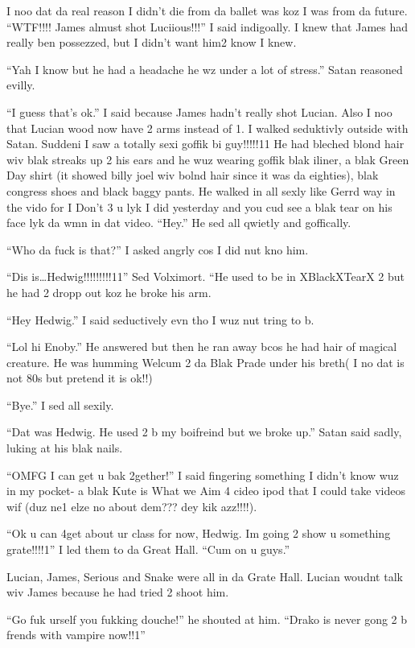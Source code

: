 I noo dat da real reason I didn't die from da ballet was koz I was from da future. \enquote{WTF!!!! James almust shot Luciious!!!} I said indigoally. I knew that James had really ben possezzed, but I didn't want him2 know I knew.

\enquote{Yah I know but he had a headache he wz under a lot of stress.} Satan reasoned evilly.

\enquote{I guess that's ok.} I said because James hadn't really shot Lucian. Also I noo that Lucian wood now have 2 arms instead of 1. I walked seduktivly outside with Satan. Suddeni I saw a totally sexi goffik bi guy!!!!!11 He had bleched blond hair wiv blak streaks up 2 his ears and he wuz wearing goffik blak iliner, a blak Green Day shirt (it showed billy joel wiv bolnd hair since it was da eighties), blak congress shoes and black baggy pants. He walked in all sexly like Gerrd way in the vido for I Don't 3 u lyk I did yesterday and you cud see a blak tear on his face lyk da wmn in dat video. \enquote{Hey.} He sed all qwietly and goffically.

\enquote{Who da fuck is that?} I asked angrly cos I did nut kno him.

\enquote{Dis is…Hedwig!!!!!!!!!11} Sed Volximort. ``He used to be in XBlackXTearX 2 but he had 2 dropp out koz he broke his arm.

\enquote{Hey Hedwig.} I said seductively evn tho I wuz nut tring to b.

\enquote{Lol hi Enoby.} He answered but then he ran away bcos he had hair of magical creature. He was humming Welcum 2 da Blak Prade under his breth( I no dat is not 80s but pretend it is ok!!)

\enquote{Bye.} I sed all sexily.

\enquote{Dat was Hedwig. He used 2 b my boifreind but we broke up.} Satan said sadly, luking at his blak nails.

\enquote{OMFG I can get u bak 2gether!} I said fingering something I didn't know wuz in my pocket- a blak Kute is What we Aim 4 cideo ipod that I could take videos wif (duz ne1 elze no about dem??? dey kik azz!!!!).

\enquote{Ok u can 4get about ur class for now, Hedwig. Im going 2 show u something grate!!!!1} I led them to da Great Hall. \enquote{Cum on u guys.}

Lucian, James, Serious and Snake were all in da Grate Hall. Lucian woudnt talk wiv James because he had tried 2 shoot him.

\enquote{Go fuk urself you fukking douche!} he shouted at him. \enquote{Drako is never gong 2 b frends with vampire now!!1}

